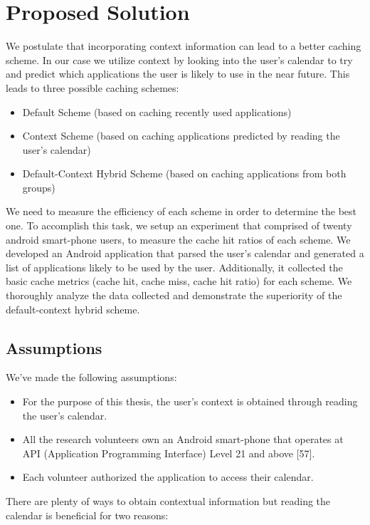 \documentclass[12pt]{uthesis-v12}  %
\begin{document}
	\section{Proposed Solution}		
		We postulate that incorporating context information can lead to a better caching scheme. In our case we utilize context by looking into the user's calendar to try and predict which applications the user is likely to use in the near future. This leads to three possible caching schemes:
		
		\begin{itemize}
			\item Default Scheme (based on caching recently used applications)
			\item Context Scheme (based on caching applications predicted by reading the user's calendar)
			\item Default-Context Hybrid Scheme (based on caching applications from both groups)
		\end{itemize}
		
		We need to measure the efficiency of each scheme in order to determine the best one. To accomplish this task, we setup an experiment that comprised of twenty android smart-phone users, to measure the cache hit ratios of each scheme. We developed an Android application that parsed the user's calendar and generated a list of applications likely to be used by the user. Additionally, it collected the basic cache metrics (cache hit, cache miss, cache hit ratio) for each scheme. We thoroughly analyze the data collected and demonstrate the superiority of the default-context hybrid scheme.  
		
		\subsection{Assumptions}	
			We've made the following assumptions:
			\begin{itemize}
				\item For the purpose of this thesis, the user's context is obtained through reading the user's calendar.
				\item All the research volunteers own an Android smart-phone that operates at API (Application Programming Interface) Level 21 and above [57].
				\item Each volunteer authorized the application to access their calendar.
			\end{itemize}
			
			There are plenty of ways to obtain contextual information but reading the calendar is beneficial for two reasons:
			
\end{document}
